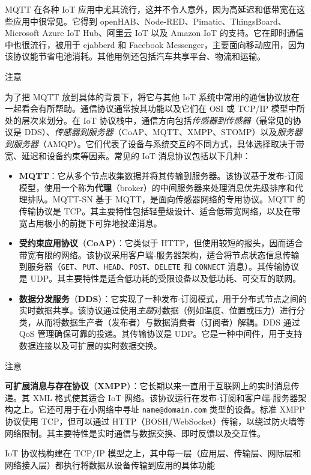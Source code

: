\label{idx:1512}
MQTT 在各种 IoT 应用中尤其流行，这并不令人意外，因为高延迟和低带宽在这些应用中很常见。它得到 openHAB、Node-RED、Pimatic、ThingsBoard、Microsoft Azure IoT Hub、阿里云 IoT 以及 Amazon IoT 的支持。它在即时通信中也很流行，被用于 ejabberd 和 Facebook Messenger，主要面向移动应用，因为该协议能节省电池消耗。其他用例还包括汽车共享平台、物流和运输。

\begin{myNotic}{注意}

为了把 MQTT 放到具体的背景下，将它与其他 IoT 系统中常用的通信协议放在一起看会有所帮助。通信协议通常按其功能以及它们在 OSI 或 TCP/IP 模型中所处的层次来划分。在 IoT 协议栈中，通信方向包括\emph{传感器到传感器}（最常见的协议是 DDS）、\emph{传感器到服务器}（CoAP、MQTT、XMPP、STOMP）以及\emph{服务器到服务器}（AMQP）。它们代表了设备与系统交互的不同方式，具体选择取决于带宽、延迟和设备约束等因素。常见的 IoT 消息协议包括以下几种：

\begin{itemize}
\label{idx:1513}
\label{idx:1514}
\item \textbf{MQTT}：它从多个节点收集数据并将其传输到服务器。该协议基于发布-订阅模型，使用一个称为\textbf{代理}（broker）的中间服务器来处理消息优先级排序和代理排队。MQTT-SN 基于 MQTT，是面向传感器网络的专用协议。MQTT 的传输协议是 TCP。其主要特性包括轻量级设计、适合低带宽网络，以及在带宽占用极小的前提下可靠地投递消息。
\label{idx:1515}
\item \textbf{受约束应用协议}（\textbf{CoAP}）：它类似于 HTTP，但使用较短的报头，因而适合带宽有限的网络。该协议采用客户端-服务器架构，适合将节点状态信息传输到服务器（\texttt{GET}、\texttt{PUT}、\texttt{HEAD}、\texttt{POST}、\texttt{DELETE} 和 \texttt{CONNECT} 消息）。其传输协议是 UDP。其主要特性是适合低功耗的受限设备以及低功耗、可交互的联网。
\label{idx:1516}
\item \textbf{数据分发服务}（\textbf{DDS}）：它实现了一种发布-订阅模式，用于分布式节点之间的实时数据共享。该协议通过使用\emph{主题}对数据（例如温度、位置或压力）进行分类，从而将数据生产者（发布者）与数据消费者（订阅者）解耦。DDS 通过 QoS 管理确保可靠的投递。其传输协议是 UDP。它是一种中间件，用于支持数据连接以及可扩展的实时数据交换。
\end{itemize}
\end{myNotic}

\begin{myNotic}{注意}

\label{idx:1517}
\textbf{可扩展消息与存在协议}（\textbf{XMPP}）：它长期以来一直用于互联网上的实时消息传递。其 XML 格式使其适合 IoT 网络。该协议运行在发布-订阅和客户端-服务器架构之上。它还可用于在小网络中寻址 \texttt{name@domain.\allowbreak{}com} 类型的设备。标准 XMPP 协议使用 TCP，但可以通过 HTTP（BOSH/WebSocket）传输，以绕过防火墙等网络限制。其主要特性是实时通信与数据交换、即时反馈以及交互性。

IoT 协议栈构建在 TCP/IP 模型之上，其中每一层（应用层、传输层、网际层和网络接入层）都执行将数据从设备传输到应用的具体功能
\end{myNotic}

